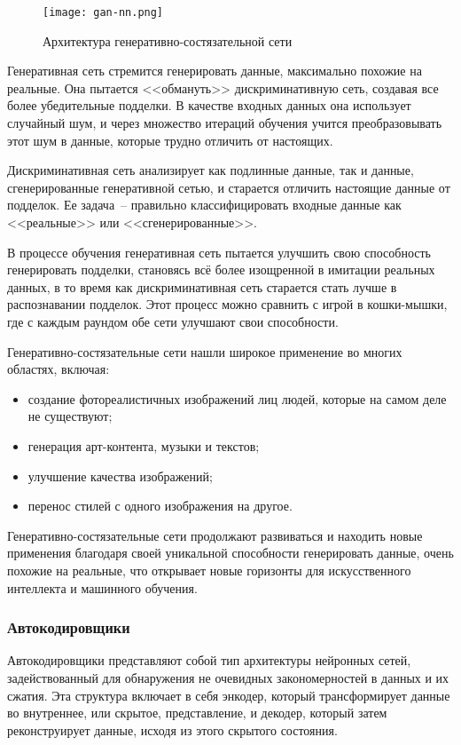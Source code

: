 \begin{figure}[ht]
    \centering
    \texttt{[image: gan-nn.png]}
    \caption{Архитектура генеративно-состязательной сети}
    \label{domain::gan-nn}
\end{figure}

Генеративная сеть стремится генерировать данные, максимально похожие на реальные. Она пытается <<обмануть>> дискриминативную сеть, создавая все более убедительные подделки. В качестве входных данных она использует случайный шум, и через множество итераций обучения учится преобразовывать этот шум в данные, которые трудно отличить от настоящих.

Дискриминативная сеть анализирует как подлинные данные, так и данные, сгенерированные генеративной сетью, и старается отличить настоящие данные от подделок. Ее задача~-- правильно классифицировать входные данные как <<реальные>> или <<сгенерированные>>.

В процессе обучения генеративная сеть пытается улучшить свою способность генерировать подделки, становясь всё более изощренной в имитации реальных данных, в то время как дискриминативная сеть старается стать лучше в распознавании подделок. Этот процесс можно сравнить с игрой в кошки-мышки, где с каждым раундом обе сети улучшают свои способности.

Генеративно-состязательные сети нашли широкое применение во многих областях, включая:

\begin{itemize}
    \item создание фотореалистичных изображений лиц людей, которые на самом деле не существуют;
    \item генерация арт-контента, музыки и текстов;
    \item улучшение качества изображений;
    \item перенос стилей с одного изображения на другое.
\end{itemize}

Генеративно-состязательные сети продолжают развиваться и находить новые применения благодаря своей уникальной способности генерировать данные, очень похожие на реальные, что открывает новые горизонты для искусственного интеллекта и машинного обучения.

\subsubsection{Автокодировщики}

Автокодировщики представляют собой тип архитектуры нейронных сетей, задействованный для обнаружения не очевидных закономерностей в данных и их сжатия. Эта структура включает в себя энкодер, который трансформирует данные во внутреннее, или скрытое, представление, и декодер, который затем реконструирует данные, исходя из этого скрытого состояния.

